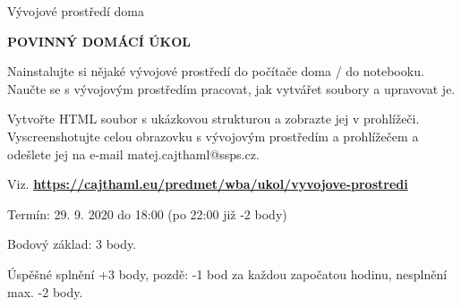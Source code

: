 \documentclass[aspectratio=1610]{beamer}
\begin{document}
\begin{frame}{Vývojové prostředí doma}
    \begin{cardTiny}
        \begin{center}
            \textbf{POVINNÝ DOMÁCÍ ÚKOL}
        \end{center}
        \begin{flushleft}
            Nainstalujte si nějaké vývojové prostředí do počítače doma / do notebooku. Naučte se s vývojovým prostředím pracovat, jak vytvářet soubory a upravovat je.

            \vspace{2ex}
            Vytvořte HTML soubor s ukázkovou strukturou a zobrazte jej v prohlížeči. Vyscreenshotujte celou obrazovku s vývojovým prostředím a prohlížečem a odešlete jej na e-mail matej.cajthaml@ssps.cz. 
            
            \vspace{2ex}
            Viz. \textbf{\href{https://cajthaml.eu/predmet/wba/ukol/vyvojove-prostredi}{https://cajthaml.eu/predmet/wba/ukol/vyvojove-prostredi}}

            Termín: 29. 9. 2020 do 18:00 (po 22:00 již -2 body)

            \vspace{2ex}
            Bodový základ: 3 body.

            Úspěšné splnění +3 body, pozdě: -1 bod za každou započatou hodinu, nesplnění max. -2 body. 
        \end{flushleft}
    \end{cardTiny}
\end{frame}
\end{document}
